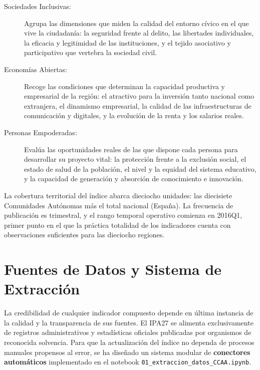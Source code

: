 \documentclass[12pt,a4paper]{article}
\begin{document}
\begin{description}
    \item[Sociedades Inclusivas:] Agrupa las dimensiones que miden la calidad del entorno cívico en el que vive la ciudadanía: la seguridad frente al delito, las libertades individuales, la eficacia y legitimidad de las instituciones, y el tejido asociativo y participativo que vertebra la sociedad civil.
    
    \item[Economías Abiertas:] Recoge las condiciones que determinan la capacidad productiva y empresarial de la región: el atractivo para la inversión tanto nacional como extranjera, el dinamismo empresarial, la calidad de las infraestructuras de comunicación y digitales, y la evolución de la renta y los salarios reales.
    
    \item[Personas Empoderadas:] Evalúa las oportunidades reales de las que dispone cada persona para desarrollar su proyecto vital: la protección frente a la exclusión social, el estado de salud de la población, el nivel y la equidad del sistema educativo, y la capacidad de generación y absorción de conocimiento e innovación.
\end{description}

La cobertura territorial del índice abarca dieciocho unidades: las diecisiete Comunidades Autónomas más el total nacional (España). La frecuencia de publicación es trimestral, y el rango temporal operativo comienza en 2016Q1, primer punto en el que la práctica totalidad de los indicadores cuenta con observaciones suficientes para las dieciocho regiones.

\section{Fuentes de Datos y Sistema de Extracción}

La credibilidad de cualquier indicador compuesto depende en última instancia de la calidad y la transparencia de sus fuentes. El IPA27 se alimenta exclusivamente de registros administrativos y estadísticas oficiales publicadas por organismos de reconocida solvencia. Para que la actualización del índice no dependa de procesos manuales propensos al error, se ha diseñado un sistema modular de \textbf{conectores automáticos} implementado en el notebook \texttt{01\_extraccion\_datos\_CCAA.ipynb}.
\end{document}
